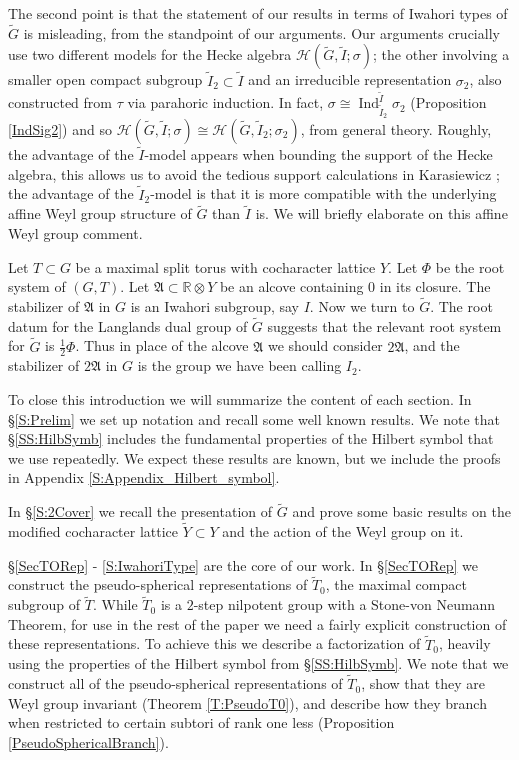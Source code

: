 \documentclass[10pt, letterpaper]{amsart}
\theoremstyle{plain}
\theoremstyle{definition}
\numberwithin{equation}{section}
\newcommand{\Gt}{\widetilde{G}}
\newcommand{\It}{\widetilde{I}}
\newcommand{\Tt}{\widetilde{T}}
\newcommand{\Yt}{\widetilde{Y}}
\newcommand{\Ind}{\operatorname{Ind}}
\newcommand{\Hcal}{\mathcal{H}}
\begin{document}
The second point is that the statement of our results in terms of Iwahori types of $\Gt$ is misleading, from the standpoint of our arguments. Our arguments crucially use two different models for the Hecke algebra $\Hcal(\Gt, \It; \sigma)$; the other involving a smaller open compact subgroup $\It_{2}\subset \It$ and an irreducible representation $\sigma_{2}$, also constructed from $\tau$ via parahoric induction. In fact, $\sigma\cong \Ind_{\It_{2}}^{\It}\sigma_{2}$ (Proposition \ref{IndSig2}) and so $\Hcal(\Gt, \It; \sigma)\cong \Hcal(\Gt, \It_{2}; \sigma_{2})$, from general theory. Roughly, the advantage of the $\It$-model appears when bounding the support of the Hecke algebra, this allows us to avoid the tedious support calculations in Karasiewicz \cite{Karasiewicz}; the advantage of the $\It_{2}$-model is that it is more compatible with the underlying affine Weyl group structure of $\Gt$ than $\It$ is. We will briefly elaborate on this affine Weyl group comment.

Let $T\subset G$ be a maximal split torus with cocharacter lattice $Y$. Let $\Phi$ be the root system of $(G,T)$. Let $\mathfrak{A}\subset \mathbb{R}\otimes Y$ be an alcove containing $0$ in its closure. The stabilizer of $\mathfrak{A}$ in $G$ is an Iwahori subgroup, say $I$. Now we turn to $\Gt$. The root datum for the Langlands dual group of $\Gt$ suggests that the relevant root system for $\Gt$ is $\frac{1}{2}\Phi$. Thus in place of the alcove $\mathfrak{A}$ we should consider $2\mathfrak{A}$, and the stabilizer of $2\mathfrak{A}$ in $G$ is the group we have been calling $I_{2}$.

\quad


To close this introduction we will summarize the content of each section. In \S \ref{S:Prelim} we set up notation and recall some well known results. We note that \S \ref{SS:HilbSymb} includes the fundamental properties of the Hilbert symbol that we use repeatedly. We expect these results are known, but we include the proofs in Appendix \ref{S:Appendix_Hilbert_symbol}.

In \S \ref{S:2Cover} we recall the presentation of $\Gt$ and prove some basic results on the modified cocharacter lattice $\Yt\subset Y$ and the action of the Weyl group on it.

\S \ref{SecTORep} - \ref{S:IwahoriType} are the core of our work. In \S \ref{SecTORep} we construct the pseudo-spherical representations of $\Tt_{0}$, the maximal compact subgroup of $\Tt$. While $\Tt_{0}$ is a $2$-step nilpotent group with a Stone-von Neumann Theorem, for use in the rest of the paper we need a fairly explicit construction of these representations. To achieve this we describe a factorization of $\Tt_{0}$, heavily using the properties of the Hilbert symbol from \S \ref{SS:HilbSymb}. We note that we construct all of the pseudo-spherical representations of $\Tt_{0}$, show that they are Weyl group invariant (Theorem \ref{T:PseudoT0}), and describe how they branch when restricted to certain subtori of rank one less (Proposition \ref{PseudoSphericalBranch}).
\end{document}
